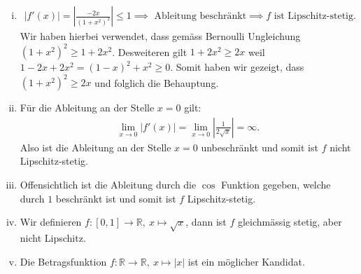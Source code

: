 \documentclass[a4paper, 20]{exam}
\begin{document}
\begin{solution} 
\begin{enumerate}[i)]

\item \begin{align*}
|f'(x)| = \left| \frac{-2x}{(1+x^2)^2}\right| \leq 1 \implies \text{ Ableitung beschränkt} \implies f \text{ ist Lipschitz-stetig}.
\end{align*}
Wir haben hierbei verwendet, dass gemäss Bernoulli Ungleichung $(1+x^2)^2 \geq 1 + 2x^2$. Desweiteren gilt $1+2x^2 \geq 2x$ weil $1-2x+2x^2 = (1-x)^2 + x^2 \geq 0$. Somit haben wir gezeigt, dass $(1+x^2)^2 \geq 2x$ und folglich die Behauptung. 
\item Für die Ableitung an der Stelle $x=0$ gilt:
\begin{align*}
\lim_{x \rightarrow 0} |f'(x)| = \lim_{x \rightarrow 0} \left| \frac{1}{2 \sqrt{x}} \right| = \infty.
\end{align*}
Also ist die Ableitung an der Stelle $x=0$ unbeschränkt und somit ist $f$ nicht Lipschitz-stetig.
\item Offensichtlich ist die Ableitung durch die $\cos$ Funktion gegeben, welche durch $1$ beschränkt ist und somit ist $f$ Lipschitz-stetig.
\item Wir definieren $f: [0,1] \longrightarrow \mathbb{R}, \ x \longmapsto \sqrt{x}$, dann ist $f$ gleichmässig stetig, aber nicht Lipschitz.
\item Die Betragsfunktion $f: \mathbb{R} \longrightarrow \mathbb{R}, \ x \longmapsto |x|$ ist ein möglicher Kandidat. 
\end{enumerate}


\end{solution}
\end{document}
